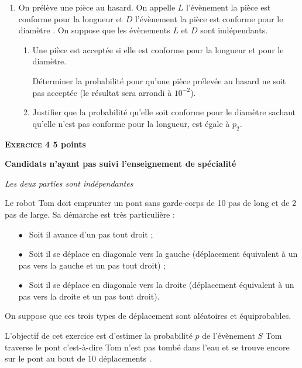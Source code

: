 \documentclass[10pt]{article}
\begin{document}
\begin{enumerate}
\item On prélève une pièce au hasard. On appelle $L$ l'évènement \og la pièce est conforme pour la longueur \fg{} et $D$ l'évènement \og la pièce est conforme pour le diamètre \fg. On suppose que les évènements $L$ et $D$ sont indépendants.
	\begin{enumerate}
		\item Une pièce est acceptée si elle est conforme pour la longueur et pour le diamètre.
		 
Déterminer la probabilité pour qu'une pièce prélevée au hasard ne soit pas acceptée (le résultat sera arrondi à $10^{-2}$). 
		\item Justifier que la probabilité qu'elle soit conforme pour le diamètre sachant qu'elle n'est pas conforme pour la longueur, est égale à $p_{2}$.
	\end{enumerate} 
\end{enumerate}

\vspace{0,5cm}

\textbf{\textsc{Exercice 4} \hfill 5 points}
 
\textbf{Candidats n'ayant pas suivi l'enseignement de spécialité }

\begin{center}  \emph{Les deux parties sont indépendantes}\end{center} 

Le robot Tom doit emprunter un pont sans garde-corps de 10 pas de long et de 2 pas de large. Sa démarche est très particulière :

\medskip
\setlength\parindent{6mm}
\begin{itemize}
\item[$\bullet~~$] Soit il avance d'un pas tout droit ; 
\item[$\bullet~~$] Soit il se déplace en diagonale vers la gauche (déplacement équivalent à un pas vers la gauche et un pas tout droit) ; 
\item[$\bullet~~$] Soit il se déplace en diagonale vers la droite (déplacement équivalent à un pas vers la droite et un pas tout droit).
\end{itemize}
\setlength\parindent{0mm}
 
On suppose que ces trois types de déplacement sont aléatoires et équiprobables.

\medskip
 
L'objectif de cet exercice est d'estimer la probabilité $p$ de l'évènement $S$ \og Tom traverse le pont\fg{} c'est-à-dire \og Tom n'est pas tombé dans l'eau et se trouve encore sur le pont au bout de 10 déplacements \fg.
\end{document}
